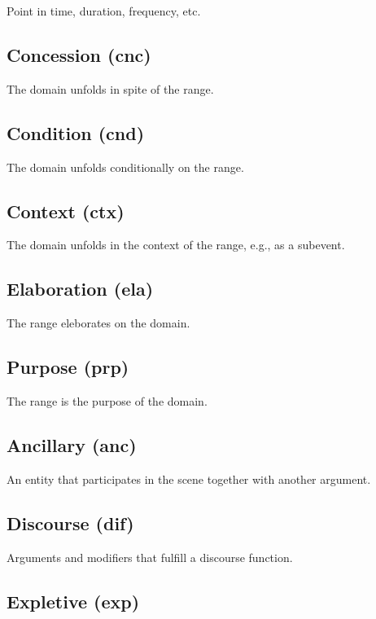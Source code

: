 \documentclass[a4paper]{article}
\begin{document}
Point in time, duration, frequency, etc.


\subsection{Concession (cnc)}

The domain unfolds in spite of the range.

\subsection{Condition (cnd)}

The domain unfolds conditionally on the range.

\subsection{Context (ctx)}

The domain unfolds in the context of the range, e.g., as a subevent.

\subsection{Elaboration (ela)}

The range eleborates on the domain.

\subsection{Purpose (prp)}

The range is the purpose of the domain.

\subsection{Ancillary (anc)}

An entity that participates in the scene together with another argument.

\subsection{Discourse (dif)}

Arguments and modifiers that fulfill a discourse function.

\subsection{Expletive (exp)}
\end{document}
